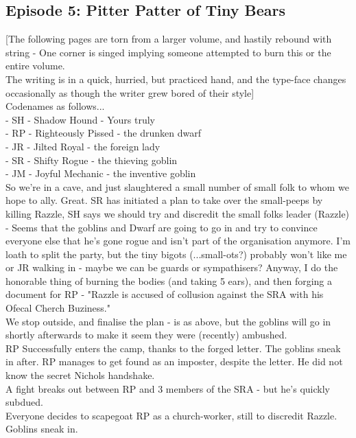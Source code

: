 \subsection{Episode 5: Pitter Patter of Tiny Bears}

[The following pages are torn from a larger volume, and hastily rebound with string - One corner is singed implying someone attempted to burn this or the entire volume.\\
The writing is in a quick, hurried, but practiced hand, and the type-face changes occasionally as though the writer grew bored of their style]\\
Codenames as follows...\\
- SH - Shadow Hound - Yours truly\\
- RP - Righteously Pissed - the drunken dwarf\\
- JR - Jilted Royal - the foreign lady\\
- SR - Shifty Rogue - the thieving goblin\\
- JM - Joyful Mechanic - the inventive goblin\\
So we’re in a cave, and just slaughtered a small number of small folk to whom we hope to ally. Great.
SR has initiated a plan to take over the small-peeps by killing Razzle, SH says we should try and discredit the small folks leader (Razzle) - Seems that the goblins and Dwarf are going to go in and try to convince everyone else that he’s gone rogue and isn’t part of the organisation anymore.\medskip
I’m loath to split the party, but the tiny bigots (...small-ots?) probably won’t like me or JR walking in - maybe we can be guards or sympathisers?\medskip
Anyway, I do the honorable thing of burning the bodies (and taking 5 ears), and then forging a document for RP -
"Razzle is accused of collusion against the SRA with his Ofecal Cherch Buziness."\\
We stop outside, and finalise the plan - is as above, but the goblins will go in shortly afterwards to make it seem they were (recently) ambushed.\\
RP Successfully enters the camp, thanks to the forged letter. The goblins sneak in after. RP manages to get found as an imposter, despite the letter. He did not know the secret Nichols handshake.\\
A fight breaks out between RP and 3 members of the SRA - but he’s quickly subdued.\\
Everyone decides to scapegoat RP as a church-worker, still to discredit Razzle. Goblins sneak in.\\
